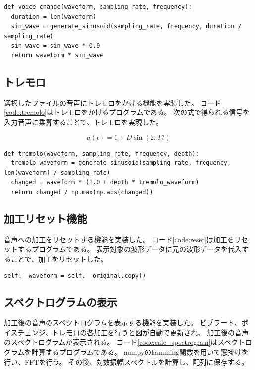 \documentclass[a4paper,11pt]{jsarticle}
\begin{document}
\begin{lstlisting}[caption=ボイスチェンジ,label=code:voice_change]
def voice_change(waveform, sampling_rate, frequency):
  duration = len(waveform)
  sin_wave = generate_sinusoid(sampling_rate, frequency, duration / sampling_rate)
  sin_wave = sin_wave * 0.9
  return waveform * sin_wave
\end{lstlisting}

\subsection{トレモロ}
選択したファイルの音声にトレモロをかける機能を実装した。
コード\ref{code:tremolo}はトレモロをかけるプログラムである。
次の式で得られる信号を入力音声に乗算することで、トレモロを実現した。

\begin{equation}
  a(t) = 1 + D \sin(2 \pi F t)
\end{equation}


\begin{lstlisting}[caption=トレモロ,label=code:tremolo]
def tremolo(waveform, sampling_rate, frequency, depth):
  tremolo_waveform = generate_sinusoid(sampling_rate, frequency, len(waveform) / sampling_rate)
  changed = waveform * (1.0 + depth * tremolo_waveform)
  return changed / np.max(np.abs(changed))
\end{lstlisting}


\subsection{加工リセット機能}
音声への加工をリセットする機能を実装した。
コード\ref{code:reset}は加工をリセットするプログラムである。
表示対象の波形データに元の波形データを代入することで、加工をリセットした。

\begin{lstlisting}[caption=加工リセット,label=code:reset]
  self.__waveform = self.__original.copy()
\end{lstlisting}


\subsection{スペクトログラムの表示}
加工後の音声のスペクトログラムを表示する機能を実装した。
ビブラート、ボイスチェンジ、トレモロの各加工を行うと図が自動で更新され、
加工後の音声のスペクトログラムが表示される。
コード\ref{code:calc_spectrogram}はスペクトログラムを計算するプログラムである。
numpyのhamming関数を用いて窓掛けを行い、FFTを行う。
その後、対数振幅スペクトルを計算し、配列に保存する。
\end{document}

